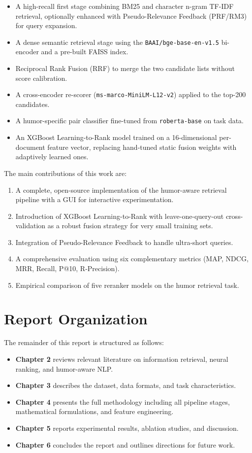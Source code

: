 \begin{itemize}
    \item A high-recall first stage combining BM25 and character n-gram TF-IDF retrieval, optionally enhanced with Pseudo-Relevance Feedback (PRF/RM3) for query expansion.
    \item A dense semantic retrieval stage using the \texttt{BAAI/bge-base-en-v1.5} bi-encoder and a pre-built FAISS index.
    \item Reciprocal Rank Fusion (RRF) to merge the two candidate lists without score calibration.
    \item A cross-encoder re-scorer (\texttt{ms-marco-MiniLM-L12-v2}) applied to the top-200 candidates.
    \item A humor-specific pair classifier fine-tuned from \texttt{roberta-base} on task data.
    \item An XGBoost Learning-to-Rank model trained on a 16-dimensional per-document feature vector, replacing hand-tuned static fusion weights with adaptively learned ones.
\end{itemize}

The main contributions of this work are:
\begin{enumerate}
    \item A complete, open-source implementation of the humor-aware retrieval pipeline with a GUI for interactive experimentation.
    \item Introduction of XGBoost Learning-to-Rank with leave-one-query-out cross-validation as a robust fusion strategy for very small training sets.
    \item Integration of Pseudo-Relevance Feedback to handle ultra-short queries.
    \item A comprehensive evaluation using six complementary metrics (MAP, NDCG, MRR, Recall, P@10, R-Precision).
    \item Empirical comparison of five reranker models on the humor retrieval task.
\end{enumerate}

\section{Report Organization}

The remainder of this report is structured as follows:

\begin{itemize}
    \item \textbf{Chapter 2} reviews relevant literature on information retrieval, neural ranking, and humor-aware NLP.
    \item \textbf{Chapter 3} describes the dataset, data formats, and task characteristics.
    \item \textbf{Chapter 4} presents the full methodology including all pipeline stages, mathematical formulations, and feature engineering.
    \item \textbf{Chapter 5} reports experimental results, ablation studies, and discussion.
    \item \textbf{Chapter 6} concludes the report and outlines directions for future work.
\end{itemize}

